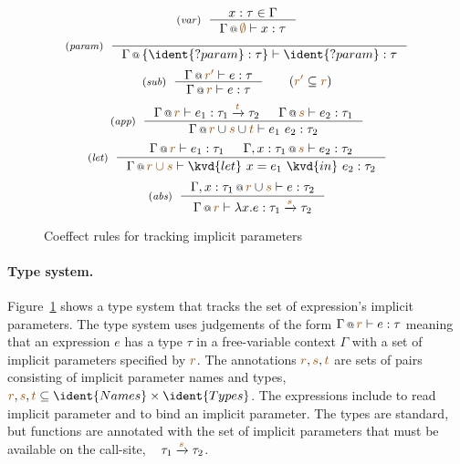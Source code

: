 \begin{figure}[t]
\begin{equation*}
\tyrule{var}
  {x : \tau \in \Gamma}
  {\coctx{\Gamma}{\aclrd{\emptyset}} \vdash x : \tau }
\end{equation*}
\begin{equation*}
\tyrule{param}
  {}
  {\coctx{\Gamma}{ \{\ident{?param}:\tau \} } \vdash \ident{?param} : \tau }
\end{equation*}
\begin{equation*}
\tyrule{sub}
  {\coctx{\Gamma}{\aclrd{r'}} \vdash e : \tau }
  {\coctx{\Gamma}{\aclrd{r}} \vdash e : \tau }\quad\quad(\aclrd{r'} \subseteq \aclrd{r})
\end{equation*}
\begin{equation*}
\tyrule{app}
  {\coctx{\Gamma}{\aclrd{r}} \vdash e_1 : \tau_1 \xrightarrow{\aclrd{t}} \tau_2 &
   \coctx{\Gamma}{\aclrd{s}} \vdash e_2 : \tau_1 }
  {\coctx{\Gamma}{\aclrd{r} \cup \aclrd{s} \cup \aclrd{t}} \vdash e_1~e_2 : \tau_2}
\end{equation*}
\begin{equation*}
\tyrule{let}
  { \coctx{\Gamma}{\aclrd{r}} \vdash e_1 : \tau_1 &
    \coctx{\Gamma, x:\tau_1}{\aclrd{s}} \vdash e_2 : \tau_2}
  {\coctx{\Gamma}{\aclrd{r \cup s}} \vdash \kvd{let}~x=e_1~\kvd{in}~e_2 : \tau_2 }
\end{equation*}
\begin{equation*}
\tyrule{abs}
  {\coctx{\Gamma, x:\tau_1}{\aclrd{r} \cup \aclrd{s}} \vdash e : \tau_2}
  {\coctx{\Gamma}{\aclrd{r}} \vdash \lambda x.e : \tau_1 \xrightarrow{\aclrd{s}} \tau_2 }
\end{equation*}
\vspace{-0.9em}
\caption{Coeffect rules for tracking implicit parameters}
\label{fig:applications-flat-impl}
\vspace{-1em}
\end{figure}


\paragraph{Type system.}

Figure~\ref{fig:applications-flat-impl} shows a type system that tracks the set of expression's 
implicit parameters. The type system uses judgements of the form $\coctx{\Gamma}{\aclrd{r}} \vdash e : \tau$
meaning that an expression $e$ has a type $\tau$ in a free-variable context $\Gamma$ with a set 
of implicit parameters specified by $\aclrd{r}$. The annotations $\aclrd{r},\aclrd{s},\aclrd{t}$ are sets of 
pairs consisting of implicit parameter names and types, \ie~$\aclrd{r},\aclrd{s},\aclrd{t} \subseteq 
  \ident{Names} \times \ident{Types}$. The expressions include  to read implicit
parameter and  to bind an implicit parameter. The types are standard, but functions are
annotated with the set of implicit parameters that must be available on the call-site, \ie~
$\tau_1 \xrightarrow{\aclrd{s}} \tau_2$.

